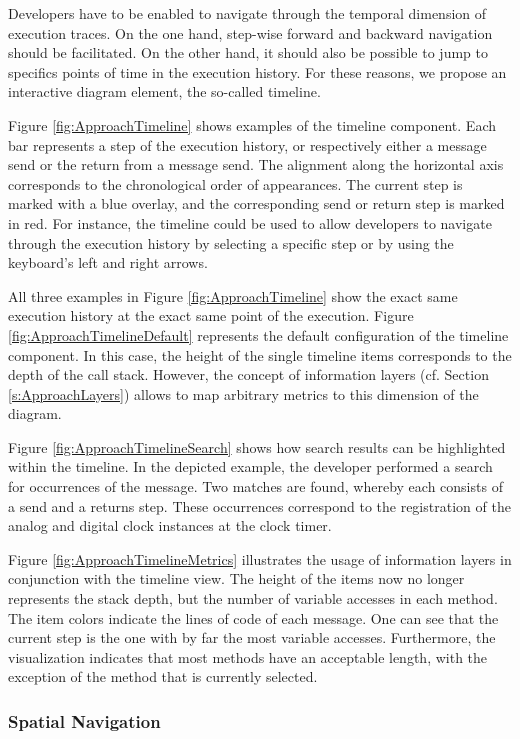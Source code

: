 Developers have to be enabled to navigate through the temporal dimension of execution traces.
On the one hand, step-wise forward and backward navigation should be facilitated.
On the other hand, it should also be possible to jump to specifics points of time in the execution history.
For these reasons, we propose an interactive diagram element, the so-called timeline.

Figure \ref{fig:ApproachTimeline} shows examples of the timeline component.
Each bar represents a step of the execution history, or respectively either a message send or the return from a message send.
The alignment along the horizontal axis corresponds to the chronological order of appearances.
The current step is marked with a blue overlay, and the corresponding send or return step is marked in red.
For instance, the timeline could be used to allow developers to navigate through the execution history by selecting a specific step or by using the keyboard's left and right arrows.

All three examples in Figure \ref{fig:ApproachTimeline} show the exact same execution history at the exact same point of the execution.
Figure \ref{fig:ApproachTimelineDefault} represents the default configuration of the timeline component.
In this case, the height of the single timeline items corresponds to the depth of the call stack.
However, the concept of information layers (cf. Section \ref{s:ApproachLayers}) allows to map arbitrary metrics to this dimension of the diagram.

Figure \ref{fig:ApproachTimelineSearch} shows how search results can be highlighted within the timeline.
In the depicted example, the developer performed a search for occurrences of the  message.
Two matches are found, whereby each consists of a send and a returns step.
These occurrences correspond to the registration of the analog and digital clock instances at the clock timer.

Figure \ref{fig:ApproachTimelineMetrics} illustrates the usage of information layers in conjunction with the timeline view.
The height of the items now no longer represents the stack depth, but the number of variable accesses in each method.
The item colors indicate the lines of code of each message.
One can see that the current step is the one with by far the most variable accesses.
Furthermore, the visualization indicates that most methods have an acceptable length, with the exception of the method that is currently selected.

\subsubsection{Spatial Navigation}

